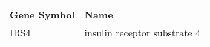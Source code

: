 \begin{tabular}{ll}
\toprule
Gene Symbol &                         Name \\
\midrule
       IRS4 & insulin receptor substrate 4 \\
\bottomrule
\end{tabular}
